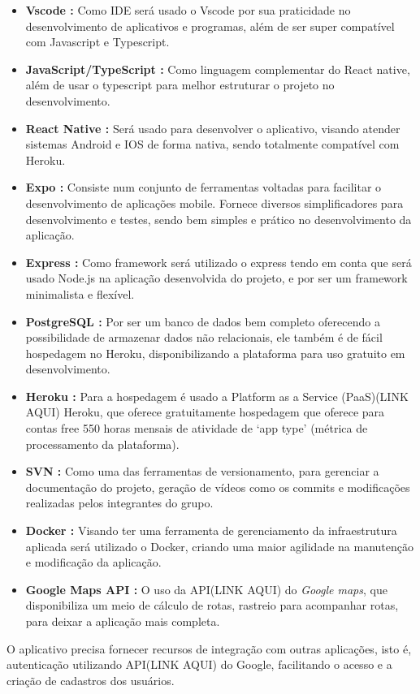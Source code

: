 \begin{itemize}
    \item \textbf{Vscode :}
    Como IDE será usado o Vscode por sua praticidade no desenvolvimento de aplicativos e programas, além de ser super compatível com Javascript e Typescript.
    \item \textbf{JavaScript/TypeScript :}
    Como linguagem complementar do React native, além de usar o typescript para melhor estruturar o projeto no desenvolvimento.
    \item \textbf{React Native :}
    Será usado para desenvolver o aplicativo, visando atender sistemas Android e IOS de forma nativa, sendo totalmente compatível com Heroku.
    \item \textbf{Expo :}
    Consiste num conjunto de ferramentas voltadas para facilitar o desenvolvimento de aplicações mobile. Fornece diversos simplificadores para desenvolvimento e testes, sendo bem simples e prático no desenvolvimento da aplicação.
    \item \textbf{Express :}
    Como framework será utilizado o express tendo em conta que será usado Node.js na aplicação desenvolvida do projeto, e  por ser um framework minimalista e flexível.
    \item \textbf{PostgreSQL :}
    Por ser um banco de dados bem completo oferecendo a possibilidade de armazenar dados não relacionais, ele também é de fácil hospedagem no Heroku, disponibilizando a plataforma para uso gratuito em desenvolvimento.
    \item \textbf{Heroku :}
    Para a hospedagem é usado a Platform as a Service (PaaS)(LINK AQUI) Heroku, que oferece gratuitamente hospedagem que oferece para contas free 550 horas mensais de atividade de ‘app type’ (métrica de processamento da plataforma).
    \item \textbf{SVN :}
    Como uma das  ferramentas de versionamento, para gerenciar a documentação do projeto, geração de vídeos como os commits e modificações  realizadas pelos integrantes do grupo.
    \item \textbf{Docker :}
    Visando ter uma ferramenta de gerenciamento da infraestrutura aplicada será utilizado o Docker, criando uma maior agilidade na manutenção e modificação da aplicação.
    \item \textbf{Google Maps API :}
    O uso da API(LINK AQUI) do \textit{Google maps}, que disponibiliza um meio de cálculo de rotas, rastreio para acompanhar rotas, para deixar a aplicação mais completa.
\end{itemize}
    O aplicativo precisa fornecer recursos de integração com outras aplicações, isto é, autenticação utilizando API(LINK AQUI) do Google, facilitando o acesso e a criação de cadastros dos usuários.

